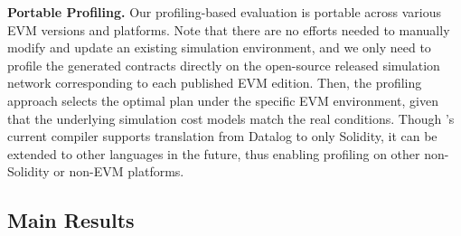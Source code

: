 \noindent \textbf{Portable Profiling.}
Our profiling-based evaluation is portable across various EVM versions and platforms. Note that there are no efforts needed to manually modify and update an existing simulation environment, and we only need to profile the generated contracts directly on the open-source released simulation network corresponding to each published EVM edition. Then, the profiling approach selects the optimal plan under the specific EVM environment, given that the underlying simulation cost models match the real conditions.
Though \proto's current compiler supports translation from Datalog to only Solidity, it can be extended to other languages in the future, thus enabling profiling on other non-Solidity or non-EVM platforms.


\subsection{Main Results}
